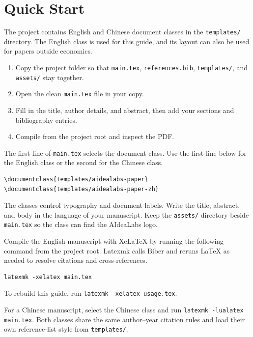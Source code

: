 \documentclass{templates/aidealabs-paper}
\begin{document}
\section{Quick Start}
\label{sec:quick-start}

The project contains English and Chinese document classes in the \texttt{templates/} directory.
The English class is used for this guide, and its layout can also be used for papers outside economics.

\begin{enumerate}
  \item Copy the project folder so that \texttt{main.tex}, \texttt{references.bib}, \texttt{templates/}, and \texttt{assets/} stay together.
  \item Open the clean \texttt{main.tex} file in your copy.
  \item Fill in the title, author details, and abstract, then add your sections and bibliography entries.
  \item Compile from the project root and inspect the PDF.
\end{enumerate}

The first line of \texttt{main.tex} selects the document class.
Use the first line below for the English class or the second for the Chinese class.

\begin{Verbatim}[fontsize=\small]
\documentclass{templates/aidealabs-paper}
\documentclass{templates/aidealabs-paper-zh}
\end{Verbatim}

The classes control typography and document labels.
Write the title, abstract, and body in the language of your manuscript.
Keep the \texttt{assets/} directory beside \texttt{main.tex} so the class can find the AIdeaLabs logo.

Compile the English manuscript with XeLaTeX by running the following command from the project root.
Latexmk calls Biber and reruns LaTeX as needed to resolve citations and cross-references.

\begin{Verbatim}[fontsize=\small]
latexmk -xelatex main.tex
\end{Verbatim}

To rebuild this guide, run \texttt{latexmk -xelatex usage.tex}.

For a Chinese manuscript, select the Chinese class and run \texttt{latexmk -lualatex main.tex}.
Both classes share the same author--year citation rules and load their own reference-list style from \texttt{templates/}.
\end{document}
